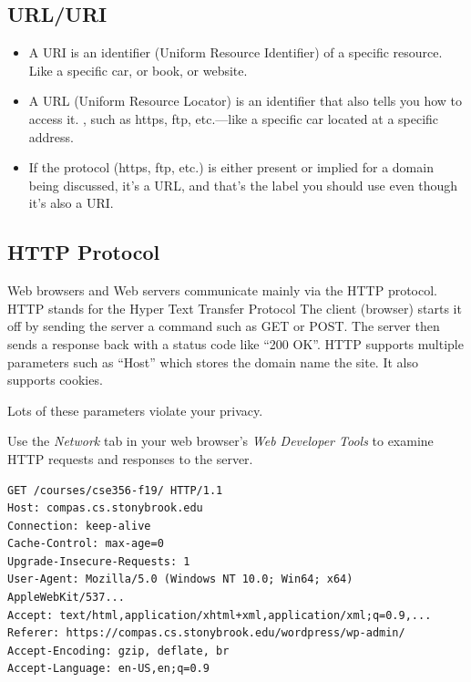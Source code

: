 \documentclass[fancy,11pt,titlestyle=display]{style/elegantbook}
\begin{document}
\subsection*{URL/URI}
\begin{itemize}
\item A URI is an identifier (Uniform Resource Identifier) of a specific resource. Like a specific car, or book, or website.
\item A URL (Uniform Resource Locator) is an identifier that also tells you how to access it. , such as https, ftp, etc.—like a specific car located at a specific address.
\item If the protocol (https, ftp, etc.) is either present or implied for a domain being discussed, it’s a URL, and that’s the label you should use even though it’s also a URI.
\end{itemize}

\subsection*{HTTP Protocol}

Web browsers and Web servers communicate mainly via the HTTP protocol. HTTP stands for the Hyper Text Transfer Protocol
The client (browser) starts it off by sending the server a command such as GET or POST. The server then sends a response back with a status code like ``200 OK''.
HTTP supports multiple parameters such as ``Host'' which stores the domain name the site. It also supports cookies.

\begin{note}
Lots of these parameters violate your privacy.
\end{note}

\begin{note}
Use the \emph{Network} tab in your web browser's \emph{Web Developer Tools} to examine HTTP requests and responses to the server.
\end{note}

\begin{sequencediagram}
\end{sequencediagram}

\begin{lstlisting}
GET /courses/cse356-f19/ HTTP/1.1
Host: compas.cs.stonybrook.edu
Connection: keep-alive
Cache-Control: max-age=0
Upgrade-Insecure-Requests: 1
User-Agent: Mozilla/5.0 (Windows NT 10.0; Win64; x64) AppleWebKit/537...
Accept: text/html,application/xhtml+xml,application/xml;q=0.9,...
Referer: https://compas.cs.stonybrook.edu/wordpress/wp-admin/
Accept-Encoding: gzip, deflate, br
Accept-Language: en-US,en;q=0.9
\end{lstlisting}
\end{document}
